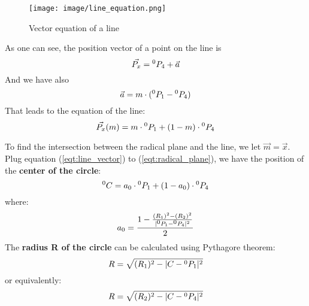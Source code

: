 \documentclass[conference]{IEEEtran}
\def\SP#1{\textsuperscript{\textcolor{black}{#1}}}
\begin{document}
  \begin{figure}[H]
  	\centering
  	\texttt{[image: image/line\_equation.png]}
  	\caption{Vector equation of a line}
  	\label{fig:line_equation}
  \end{figure}
  As one can see, the position vector of a point on the line is
  \begin{equation}
  	\centering
  	\vec{P_x} = \SP{0}P_4 + \vec{a}
  \end{equation}
  And we have also
  \begin{equation}
  	\centering
  	\vec{a} = m\cdot (\SP{0}P_1- \SP{0}P_4)
  \end{equation}
  That leads to the equation of the line:
  \begin{equation} \label{eqt:line_vector}
  	\centering
  	\vec{P_x}(m) = m\cdot\SP{0}P_1 + (1-m) \cdot \SP{0}P_4
  \end{equation}
  
  To find the intersection between the radical plane and the line, we let $\vec{m}=\vec{x}$. Plug equation (\ref{eqt:line_vector}) to (\ref{eqt:radical_plane}), we have the position of the \textbf{center of the circle}:
  \begin{equation} \label{eqt:center_position}
  \centering
  \SP{0}C= a_0\cdot\SP{0}P_1 + (1-a_0) \cdot \SP{0}P_4
  \end{equation}
  where:
  \begin{equation} \label{eqt:center_a0}
  \centering
  a_0 = \frac{1 - \frac{(R_1)^2-(R_2)^2}{|\SP{0}P_1-\SP{0}P_4|^2}}{2}
  \end{equation}
  The \textbf{radius R of the circle} can be calculated using Pythagore theorem:
  \begin{equation} \label{eqt:circle_radius_1}
  \centering
  R = \sqrt{(R_1)^2 - |C -\SP{0}P_1|^2}
  \end{equation}
  or equivalently:
  \begin{equation} \label{eqt:circle_radius_4}
  \centering
  R = \sqrt{(R_2)^2 - |C -\SP{0}P_4|^2}
  \end{equation}
  
\end{document}
